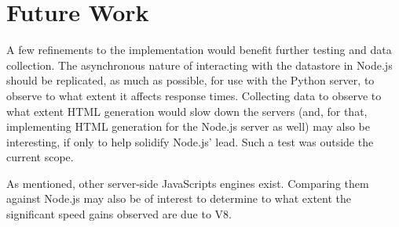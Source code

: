 \section{\label{sec:fw}Future Work}

A few refinements to the implementation would benefit further testing and data collection. The asynchronous nature of interacting with the datastore in Node.js should be replicated, as much as possible, for use with the Python server, to observe to what extent it affects response times. Collecting data to observe to what extent HTML generation would slow down the servers (and, for that, implementing HTML generation for the Node.js server as well) may also be interesting, if only to help solidify Node.js' lead. Such a test was outside the current scope.

As mentioned, other server-side JavaScripts engines exist. Comparing them against Node.js may also be of interest to determine to what extent the significant speed gains observed are due to V8.
